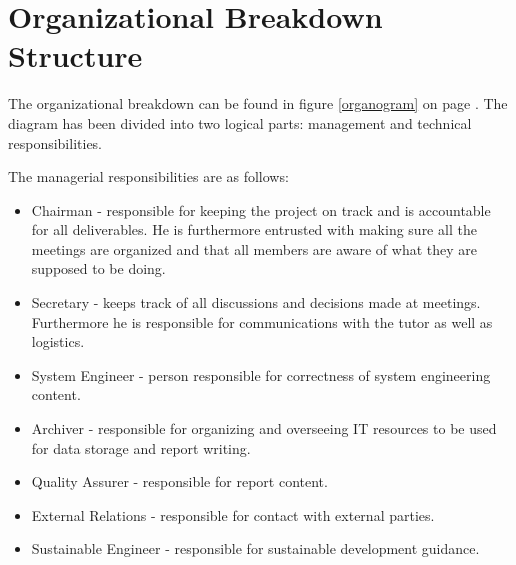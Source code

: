 \section{Organizational Breakdown Structure}
\label{dsePPOBS}
The organizational breakdown can be found in figure \ref{organogram} on page \pageref{organogram}. The diagram has been divided into two logical parts: management and technical responsibilities.

The managerial responsibilities are as follows:
\begin{itemize}
	\item Chairman - responsible for keeping the project on track and is accountable for all deliverables. He is furthermore entrusted with making sure all the meetings are organized and that all members are aware of what they are supposed to be doing.
	\item Secretary - keeps track of all discussions and decisions made at meetings. Furthermore he is responsible for communications with the tutor as well as logistics.
	\item System Engineer - person responsible for correctness of system engineering content.
	\item Archiver - responsible for organizing and overseeing IT resources to be used for data storage and report writing.
	\item Quality Assurer - responsible for report content.
	\item External Relations - responsible for contact with external parties.
	\item Sustainable Engineer - responsible for sustainable development guidance. 
\end{itemize}

